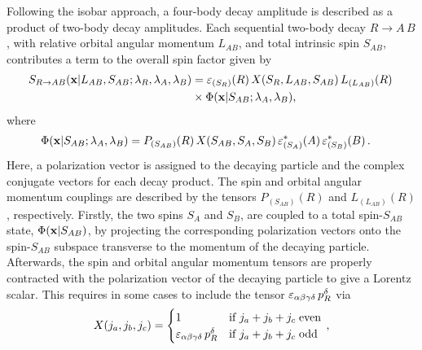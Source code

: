 Following the isobar approach, a four-body decay amplitude is described as a product of two-body decay amplitudes.
Each sequential two-body decay $R \to A \, B$, 
with relative orbital angular momentum $L_{AB}$, and total intrinsic spin $S_{AB}$,
contributes a term to the overall spin factor given by
\begin{align}
	\nonumber
	S_{R \rightarrow A B}(\bold x \vert L_{AB}, S_{AB} ; \lambda_{R}, \lambda_{A}, \lambda_{B})  &=
	 {\varepsilon}_{(S_{R})}(R) \, X(S_{R},L_{AB},S_{AB}) \,  L_{(L_{AB})}(R) \,    \\
          &\times \Phi(\bold x \vert S_{AB} ; \lambda_{A} , \lambda_{B}) ,
          \label{eq:spin1}
\end{align}
where
\begin{align}
	 \Phi(\bold x \vert S_{AB} ; \lambda_{A} , \lambda_{B})  &=  P_{(S_{AB})}(R) \, X(S_{AB},S_{A},S_{B})  \, {\varepsilon}^{*}_{(S_{A})}(A)  \, {\varepsilon}^{*}_{(S_{B})}(B)  \,   .
          \label{eq:spin2}
\end{align}
Here, a polarization vector is assigned to the decaying particle 
and the complex conjugate vectors for each decay product.
The spin and orbital angular momentum couplings are described by the tensors $P_{(S_{AB})}(R)$
and $L_{(L_{AB})}(R)$, respectively.
Firstly, the two spins $S_{A}$ and $S_{B}$, are coupled to a total spin-$S_{AB}$ state, $\Phi(\bold x \vert S_{AB})$,
by projecting the corresponding polarization vectors  onto the spin-$S_{AB}$
subspace transverse to the momentum of the decaying particle.
Afterwards, the spin and orbital angular momentum tensors are properly contracted with the
polarization vector of the decaying particle to give a Lorentz scalar.
This requires in some cases to include the tensor ${\varepsilon}_{\alpha\beta\gamma\delta} \, p_{R}^{\delta}$ via
\begin{equation}
	  X(j_{a},j_{b},j_{c}) = 		
	  \begin{cases}
			  1 & \mbox{if } j_{a} + j_{b} + j_{c} \; {\rm even} \\
			   {\varepsilon}_{\alpha \beta \gamma \delta} \, p_{R}^{\delta} & \mbox{if } j_{a} + j_{b} + j_{c} \; {\rm odd}
	 \end{cases} \, ,
\end{equation}
